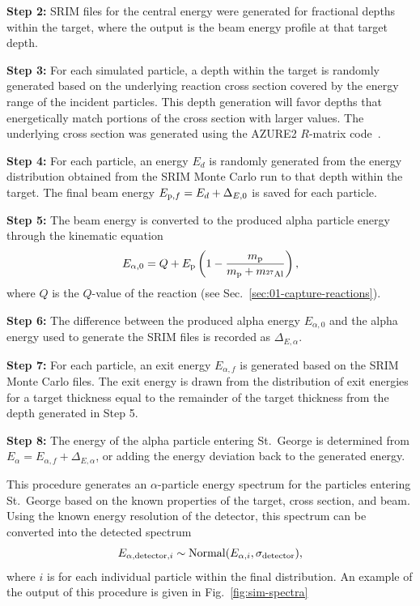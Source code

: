 \textbf{Step 2:}
  SRIM files for the central energy were generated for fractional depths
  within the target, where the output is the beam energy profile at that
  target depth.

\textbf{Step 3:}
  For each simulated particle, a depth within the target is randomly
  generated based on the underlying reaction cross section covered by
  the energy range of the incident particles. This depth generation will
  favor depths that energetically match portions of the cross section
  with larger values. The underlying cross section was generated using
  the AZURE2 $R$-matrix code~\cite{AZURE2, deBoer2017}.

\textbf{Step 4:}
  For each particle, an energy $E_d$ is randomly generated from the
  energy distribution obtained from the SRIM Monte Carlo run to that
  depth within the target. The final beam energy $E_{{\rm p},f} = E_d +
  \Delta_{E,0}$ is saved for each particle.

\textbf{Step 5:}
  The beam energy is converted to the produced alpha particle energy
  through the kinematic equation
  \[
      E_{\alpha,0} = Q + E_{\rm p}\left(
          1 - \frac{m_{\rm p}}{m_{\rm p} + m_{\mnuc{27}{Al}}} %
      \right),
  \]
  where $Q$ is the $Q$-value of the reaction (see
  Sec.~\ref{sec:01-capture-reactions}).

\textbf{Step 6:}
  The difference between the produced alpha energy $E_{\alpha,0}$ and
  the alpha energy used to generate the SRIM files is recorded as
  $\Delta_{E,\alpha}$.

\textbf{Step 7:}
  For each particle, an exit energy $E_{\alpha,f}$ is generated based on
  the SRIM Monte Carlo files. The exit energy is drawn from the
  distribution of exit energies for a target thickness equal to the
  remainder of the target thickness from the depth generated in Step 5.

\textbf{Step 8:}
  The energy of the alpha particle entering St.\ George is determined
  from $E_{\alpha} = E_{\alpha,f} + \Delta_{E,\alpha}$, or adding the
  energy deviation back to the generated energy.

This procedure generates an $\alpha$-particle energy spectrum for the
particles entering St.\ George based on the known properties of the
target, cross section, and beam. Using the known energy resolution of
the detector, this spectrum can be converted into the detected spectrum
\[
    E_{\alpha,{\rm detector},i} \sim {\rm Normal}(E_{\alpha,i},\sigma_{\rm detector}),
\]
where $i$ is for each individual particle within the final distribution.
An example of the output of this procedure is given in
Fig.~\ref{fig:sim-spectra}



